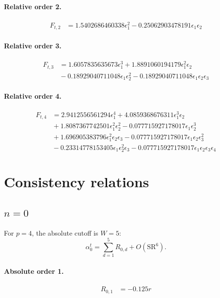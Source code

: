 \documentclass[10pt]{article}
\begin{document}
\paragraph{Relative order 2.}
\begin{align*}
F_{t,2} &= 1.5402686460338 \epsilon_{1}^{2} - 0.25062903478191 \epsilon_{1} \epsilon_{2}
\end{align*}

\paragraph{Relative order 3.}
\begin{align*}
F_{t,3} &= 1.6057835635673 \epsilon_{1}^{3} + 1.8891060194179 \epsilon_{1}^{2} \epsilon_{2} \\
&{}  - 0.18929040711048 \epsilon_{1} \epsilon_{2}^{2} - 0.18929040711048 \epsilon_{1} \epsilon_{2} \epsilon_{3}
\end{align*}

\paragraph{Relative order 4.}
\begin{align*}
F_{t,4} &= 2.9412556561294 \epsilon_{1}^{4} + 4.0859368676311 \epsilon_{1}^{3} \epsilon_{2} \\
&{}  + 1.8087367742501 \epsilon_{1}^{2} \epsilon_{2}^{2} - 0.077715927178017 \epsilon_{1} \epsilon_{2}^{3} \\
&{}  + 1.696905383796 \epsilon_{1}^{2} \epsilon_{2} \epsilon_{3} - 0.077715927178017 \epsilon_{1} \epsilon_{2} \epsilon_{3}^{2} \\
&{}  - 0.23314778153405 \epsilon_{1} \epsilon_{2}^{2} \epsilon_{3} - 0.077715927178017 \epsilon_{1} \epsilon_{2} \epsilon_{3} \epsilon_{4}
\end{align*}

\section{Consistency relations}
\subsection{$n=0$}
For $p=4$, the absolute cutoff is $W=5$:
\[\alpha_{0}^t=\sum_{d=1}^{5}R_{0,d}+O(\mathrm{SR}^{6}).\]
\paragraph{Absolute order 1.}
\begin{align*}
R_{0,1} &=  - 0.125 r
\end{align*}
\end{document}
